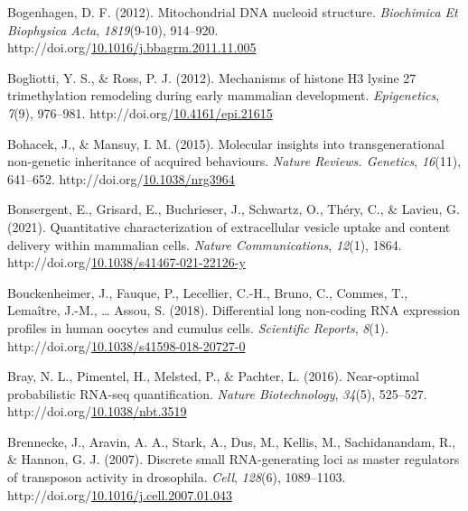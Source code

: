 \documentclass[12pt,twoside]{reedthesis}
\newlength{\cslhangindent}
\newenvironment{CSLReferences}[2] %
 {%
  \setlength{\parindent}{0pt}
  \ifodd #1 \everypar{\setlength{\hangindent}{\cslhangindent}}\ignorespaces\fi
  \ifnum #2 > 0
  \setlength{\parskip}{#2\baselineskip}
  \fi
 }%
 {}
\begin{document}
\begin{CSLReferences}{1}{0}
\leavevmode{}%
Bogenhagen, D. F. (2012). Mitochondrial DNA nucleoid structure. \emph{Biochimica Et Biophysica Acta}, \emph{1819}(9-10), 914--920. http://doi.org/\href{https://doi.org/10.1016/j.bbagrm.2011.11.005}{10.1016/j.bbagrm.2011.11.005}

\leavevmode{}%
Bogliotti, Y. S., \& Ross, P. J. (2012). Mechanisms of histone H3 lysine 27 trimethylation remodeling during early mammalian development. \emph{Epigenetics}, \emph{7}(9), 976--981. http://doi.org/\href{https://doi.org/10.4161/epi.21615}{10.4161/epi.21615}

\leavevmode{}%
Bohacek, J., \& Mansuy, I. M. (2015). Molecular insights into transgenerational non-genetic inheritance of acquired behaviours. \emph{Nature Reviews. Genetics}, \emph{16}(11), 641--652. http://doi.org/\href{https://doi.org/10.1038/nrg3964}{10.1038/nrg3964}

\leavevmode{}%
Bonsergent, E., Grisard, E., Buchrieser, J., Schwartz, O., Théry, C., \& Lavieu, G. (2021). Quantitative characterization of extracellular vesicle uptake and content delivery within mammalian cells. \emph{Nature Communications}, \emph{12}(1), 1864. http://doi.org/\href{https://doi.org/10.1038/s41467-021-22126-y}{10.1038/s41467-021-22126-y}

\leavevmode{}%
Bouckenheimer, J., Fauque, P., Lecellier, C.-H., Bruno, C., Commes, T., Lemaître, J.-M., \ldots{} Assou, S. (2018). Differential long non-coding RNA expression profiles in human oocytes and cumulus cells. \emph{Scientific Reports}, \emph{8}(1). http://doi.org/\href{https://doi.org/10.1038/s41598-018-20727-0}{10.1038/s41598-018-20727-0}

\leavevmode{}%
Bray, N. L., Pimentel, H., Melsted, P., \& Pachter, L. (2016). Near-optimal probabilistic RNA-seq quantification. \emph{Nature Biotechnology}, \emph{34}(5), 525--527. http://doi.org/\href{https://doi.org/10.1038/nbt.3519}{10.1038/nbt.3519}

\leavevmode{}%
Brennecke, J., Aravin, A. A., Stark, A., Dus, M., Kellis, M., Sachidanandam, R., \& Hannon, G. J. (2007). Discrete small RNA-generating loci as master regulators of transposon activity in drosophila. \emph{Cell}, \emph{128}(6), 1089--1103. http://doi.org/\href{https://doi.org/10.1016/j.cell.2007.01.043}{10.1016/j.cell.2007.01.043}


\end{CSLReferences}
\end{document}
